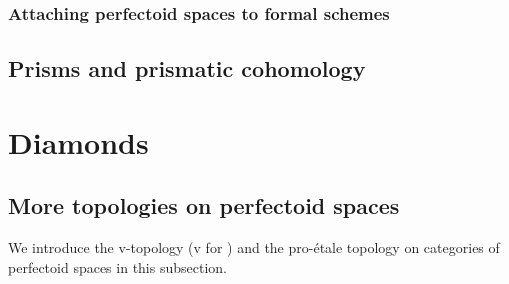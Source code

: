             \subsubsection{Attaching perfectoid spaces to formal schemes}
            
        \subsection{Prisms and prismatic cohomology}
        
    \section{Diamonds} \label{section: diamonds}
        \subsection{More topologies on perfectoid spaces}
            We introduce the v-topology (v for ) and the pro-\'etale topology on categories of perfectoid spaces in this subsection.
        
